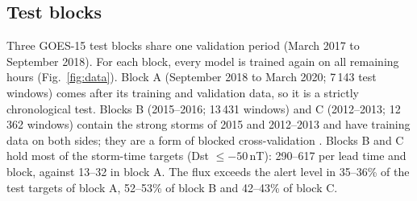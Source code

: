 \documentclass[a4paper,fleqn]{cas-dc}
\begin{document}
\subsection{Test blocks}
\label{sec:blocks}
Three GOES-15 test blocks share one validation period (March 2017 to September 2018). For each block, every
model is trained again on all remaining hours (Fig.~\ref{fig:data}). Block A (September 2018 to March 2020;
7\,143 test windows) comes after its training and validation data, so it is a strictly chronological test.
Blocks B (2015--2016; 13\,431 windows) and C (2012--2013; 12\,362 windows) contain the strong storms of 2015 and
2012--2013 and have training data on both sides; they are a form of blocked cross-validation
\citep{bergmeir2018}. Blocks B and C hold most of the storm-time targets (Dst \(\le-50\)\,nT): 290--617 per lead
time and block, against 13--32 in block A. The flux exceeds the alert level in 35--36\% of the test targets of
block A, 52--53\% of block B and 42--43\% of block C.
\end{document}
